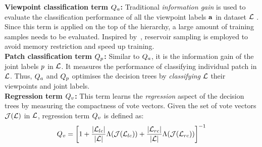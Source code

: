 \noindent\textbf{Viewpoint classification term $Q_{a}$:} Traditional \emph{information gain} is used to evaluate the classification performance of all the viewpoint labels $\mathbf{a}$ in dataset $\mathcal{L}$ \cite{Breiman_ML_01}. Since this term is applied on the top of the hierarchy, a large amount of training samples needs to be evaluated. Inspired by~\cite{Girshick_ICCV_11}, reservoir sampling is employed to avoid memory restriction and speed up training.\\ 
\textbf{Patch classification term $Q_{p}$: } Similar to $Q_{a}$, it is the information gain of the joint labels $p$ in $\mathcal{L}$. It measures the performance of classifying individual patch in $\mathcal{L}$. 
Thus, $Q_{a}$ and $Q_{p}$ optimises the decision trees by \emph{classifying} $\mathcal{L}$ their viewpoints and joint labels. \\
\textbf{Regression term $Q_{v}$:} This term learns the \emph{regression} aspect of the decision trees by measuring the compactness of vote vectors. Given the set of vote vectors $\mathcal{J}(\mathcal{L})$ in $\mathcal{L}$, regression term $Q_{v}$ is defined as:
\begin{equation}
	Q_{v} = \left[ 1 + 
	\frac{|\mathcal{L}_{lc}|}{|\mathcal{L}|} \mathrm{\Lambda}(\mathcal{J}(\mathcal{L}_{lc})) +  
\frac{|\mathcal{L}_{rc}|}{|\mathcal{L}|} \mathrm{\Lambda}(\mathcal{J}(\mathcal{L}_{rc})) \right]^{-1}
	\label{eq:regterm}
\end{equation}

